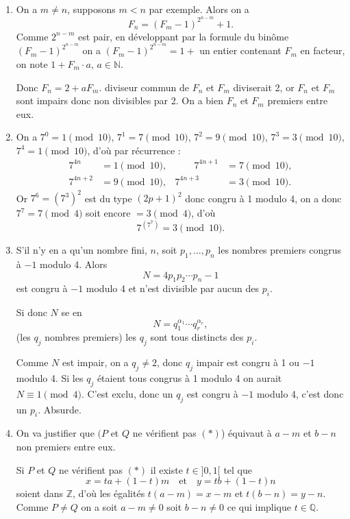 \begin{enumerate}[label=\arabic*.,leftmargin=2.2em,itemsep=1.15em]

\item On a $m\ne n$, supposons $m<n$ par exemple. Alors on a
\[
F_n=(F_m-1)^{2^{n-m}}+1.
\]
Comme $2^{n-m}$ est pair, en développant par la formule du binôme $(F_m-1)^{2^{n-m}}$ on a $(F_m-1)^{2^{n-m}}=1+$ un entier contenant $F_m$ en facteur, on note $1+F_m\cdot a$, $a\in\mathbb N$.

Donc $F_n=2+aF_m$.  diviseur commun de $F_n$ et $F_m$ diviserait 2, or $F_n$ et $F_m$ sont impairs donc non divisibles par 2. On a bien $F_n$ et $F_m$ premiers entre eux.

\item On a $7^0=1\pmod{10}$, $7^1=7\pmod{10}$, $7^2=9\pmod{10}$, $7^3=3\pmod{10}$, $7^4=1\pmod{10}$, d'où par récurrence :
\[
\begin{aligned}
7^{4n}&=1\pmod{10},&\qquad 7^{4n+1}&=7\pmod{10},\\
7^{4n+2}&=9\pmod{10},& 7^{4n+3}&=3\pmod{10}.
\end{aligned}
\]
Or $7^6=(7^3)^2$ est du type $(2p+1)^2$ donc congru à 1 modulo 4, on a donc $7^7=7\pmod4$ soit encore $=3\pmod4$, d'où
\[
7^{(7^7)}=3\pmod{10}.
\]

\item S'il n'y en a qu'un nombre fini, $n$, soit $p_1,\ldots,p_n$ les nombres premiers congrus à $-1$ modulo 4. Alors
\[
N=4p_1p_2\cdots p_n-1
\]
est congru à $-1$ modulo 4 et n'est divisible par aucun des $p_i$.

Si donc $N$ se  en
\[
N=q_1^{\alpha_1}\cdots q_r^{\alpha_r},
\]
(les $q_j$ nombres premiers) les $q_j$ sont tous distincts des $p_i$.

Comme $N$ est impair, on a $q_j\ne2$, donc $q_j$ impair est congru à 1 ou $-1$ modulo 4. Si les $q_j$ étaient tous congrus à 1 modulo 4 on aurait $N\equiv1\pmod4$. C'est exclu, donc un $q_j$ est congru à $-1$ modulo 4, c'est donc un $p_i$. Absurde.

\item On va justifier que $(P$ et $Q$ ne vérifient pas $(*)$) équivaut à $a-m$ et $b-n$ non premiers entre eux.

Si $P$ et $Q$ ne vérifient pas $(*)$ il existe $t\in]0,1[$ tel que
\[
x=ta+(1-t)m\quad\text{et}\quad y=tb+(1-t)n
\]
soient dans $\mathbb Z$, d'où les égalités $t(a-m)=x-m$ et $t(b-n)=y-n$. Comme $P\ne Q$ on a soit $a-m\ne0$ soit $b-n\ne0$ ce qui implique $t\in\mathbb Q$.


\end{enumerate}
